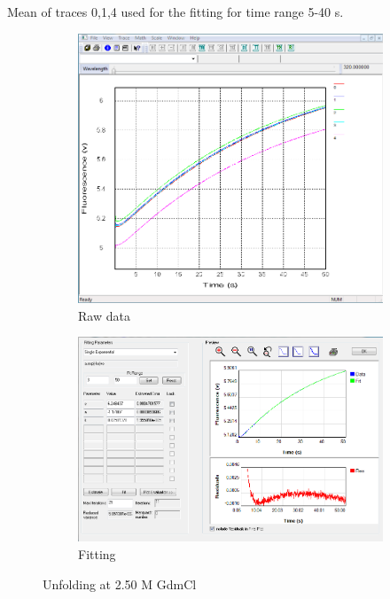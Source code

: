 \documentclass[a4paper,english,12pt,bibliography=totoc]{scrreprt}
\begin{document}
Mean of traces 0,1,4 used for the fitting for time range 5-40 s.
\begin{figure}[H]
    \centering
    \begin{subfigure}[b]{0.45\textwidth}
        \centering
        \includegraphics[width=\textwidth]{Images/G8/uf1_raw.PNG}
        \caption{Raw data }
        \label{fig:sub1}
    \end{subfigure}
    \hspace{0cm} %
    \begin{subfigure}[b]{0.45\textwidth}
        \centering
        \includegraphics[width=\textwidth]{Images/G8/uf1_fitting.PNG}
        \caption{Fitting}
        \label{fig:sub2}
    \end{subfigure}
    \caption{Unfolding at 2.50 M GdmCl }
    \label{fig:main}
\end{figure}
\end{document}
